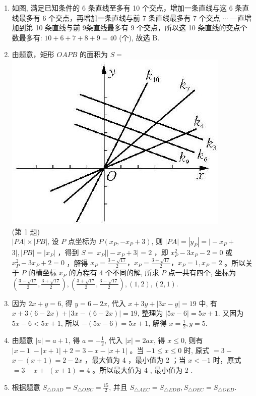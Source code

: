 \documentclass[10pt]{article}
\begin{document}
\begin{enumerate}
  \item 如图, 满足已知条件的 6 条直线至多有 10 个交点，增加一条直线与这 6 条直线最多有 6 个交点，再增加一条直线与前 7 条直线最多有 7 个交点 $\cdots$ —直增加到第 10 条直线与前 9条直线最多有 9 个交点，所以这 10 条直线的交点个数最多有: $10+6+7+8+9=40$ (个), 故选 B.
  \item 由题意，矩形 $O A P B$ 的面积为 $S=$\\
\includegraphics[max width=\textwidth, center]{2024_10_30_1bf34f7aeb61f11d11d3g-107}\\
(第 1 题)\\
$|P A| \times|P B|$, 设 $P$ 点坐标为 $P\left(x_{P},-x_{P}+3\right)$, 则 $|P A|=\left|y_{P}\right|=\mid-x_{P}+$ $3\left|,|P B|=\left|x_{P}\right|\right.$ ，得到 $\left.S=\left|x_{P}\right|\right|-x_{P}+3 \mid=2$ ，即 $x_{P}^{2}-3 x_{P}-2=0$ 或 $x_{P}^{2}-3 x_{P}+2=0$ ，解得 $x_{P}=\frac{3-\sqrt{17}}{2} ， x_{P}=\frac{3+\sqrt{17}}{2} ， x_{P}=1, x_{P}=2$ 。所以关于 $P$ 的横坐标 $x_{P}$ 的方程有 4 个不同的解, 所求 $P$ 点一共有四个, 坐标为 $\left(\frac{3-\sqrt{17}}{2}, \frac{3+\sqrt{17}}{2}\right),\left(\frac{3+\sqrt{17}}{2}, \frac{3-\sqrt{17}}{2}\right),(1,2),(2,1)$.
  \item 因为 $2 x+y=6$, 得 $y=6-2 x$, 代入 $x+3 y+|3 x-y|=19$ 中, 有 $x+3(6-2 x)+|3 x-(6-2 x)|=19$, 整理为 $|5 x-6|=5 x+1$. 又因为 $5 x-6<5 x+1$, 所以 $-(5 x-6)=5 x+1$, 解得 $x=\frac{1}{2}, y=5$.
  \item 由题意 $|a|=a+1$, 得 $a=-\frac{1}{2}$, 代入 $|x|=2 a x$, 得 $x \leqslant 0$, 则有 $|x-1|-|x+1|+2=3-x-|x+1|$ 。当 $-1 \leqslant x \leqslant 0$ 时, 原式 $=3-$ $x-(x+1)=2-2 x$ ，最大值为 4 ，最小值为 2 ；当 $x<-1$ 时，原式 $=3-x+$ $(x+1)=4$ 。所以最大值为 4 , 最小值为 2 .
  \item 根据题意 $S_{\triangle O A D}=S_{\triangle O B C}=\frac{15}{2}$, 并且 $S_{\triangle A E C}=S_{\triangle E D B}, S_{\triangle O E C}=S_{\triangle O E D}$.
\end{enumerate}
\end{document}
